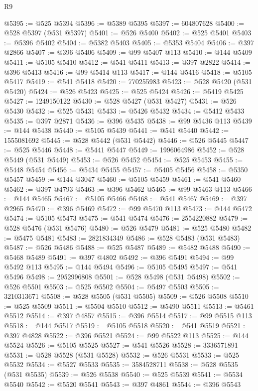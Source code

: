 \begin{lexlean}{R9}
\begin{coremodule}
@5395 := @525 @5394
@5396 := @5389 @5395
@5397 := 604807628
@5400 := @528 @5397 (@531 @5397)
@5401 := @526 @5400
@5402 := @525 @5401
@5403 := @5396 @5402
@5404 := @5382 @5403
@5405 := @5353 @5404
@5406 := @397 @2866
@5407 := @396 @5406
@5409 := @99 @5407 @113
@5410 := @144 @5409
@5411 := @5105 @5410
@5412 := @541 @5411
@5413 := @397 @2822
@5414 := @396 @5413
@5416 := @99 @5414 @113
@5417 := @144 @5416
@5418 := @5105 @5417
@5419 := @541 @5418
@5420 := 770255983
@5423 := @528 @5420 (@531 @5420)
@5424 := @526 @5423
@5425 := @525 @5424
@5426 := @5419 @5425
@5427 := 1249150122
@5430 := @528 @5427 (@531 @5427)
@5431 := @526 @5430
@5432 := @525 @5431
@5433 := @5426 @5432
@5434 := @5412 @5433
@5435 := @397 @2871
@5436 := @396 @5435
@5438 := @99 @5436 @113
@5439 := @144 @5438
@5440 := @5105 @5439
@5441 := @541 @5440
@5442 := 1555081692
@5445 := @528 @5442 (@531 @5442)
@5446 := @526 @5445
@5447 := @525 @5446
@5448 := @5441 @5447
@5449 := 1996064986
@5452 := @528 @5449 (@531 @5449)
@5453 := @526 @5452
@5454 := @525 @5453
@5455 := @5448 @5454
@5456 := @5434 @5455
@5457 := @5405 @5456
@5458 := @5350 @5457
@5459 := @144 @3047
@5460 := @5105 @5459
@5461 := @541 @5460
@5462 := @397 @4793
@5463 := @396 @5462
@5465 := @99 @5463 @113
@5466 := @144 @5465
@5467 := @5105 @5466
@5468 := @541 @5467
@5469 := @397 @2965
@5470 := @396 @5469
@5472 := @99 @5470 @113
@5473 := @144 @5472
@5474 := @5105 @5473
@5475 := @541 @5474
@5476 := 2554220882
@5479 := @528 @5476 (@531 @5476)
@5480 := @526 @5479
@5481 := @525 @5480
@5482 := @5475 @5481
@5483 := 2821834349
@5486 := @528 @5483 (@531 @5483)
@5487 := @526 @5486
@5488 := @525 @5487
@5489 := @5482 @5488
@5490 := @5468 @5489
@5491 := @397 @4802
@5492 := @396 @5491
@5494 := @99 @5492 @113
@5495 := @144 @5494
@5496 := @5105 @5495
@5497 := @541 @5496
@5498 := 2952996808
@5501 := @528 @5498 (@531 @5498)
@5502 := @526 @5501
@5503 := @525 @5502
@5504 := @5497 @5503
@5505 := 3210313671
@5508 := @528 @5505 (@531 @5505)
@5509 := @526 @5508
@5510 := @525 @5509
@5511 := @5504 @5510
@5512 := @5490 @5511
@5513 := @5461 @5512
@5514 := @397 @4857
@5515 := @396 @5514
@5517 := @99 @5515 @113
@5518 := @144 @5517
@5519 := @5105 @5518
@5520 := @541 @5519
@5521 := @397 @4828
@5522 := @396 @5521
@5524 := @99 @5522 @113
@5525 := @144 @5524
@5526 := @5105 @5525
@5527 := @541 @5526
@5528 := 3336571891
@5531 := @528 @5528 (@531 @5528)
@5532 := @526 @5531
@5533 := @525 @5532
@5534 := @5527 @5533
@5535 := 3584528711
@5538 := @528 @5535 (@531 @5535)
@5539 := @526 @5538
@5540 := @525 @5539
@5541 := @5534 @5540
@5542 := @5520 @5541
@5543 := @397 @4861
@5544 := @396 @5543

\end{coremodule}
\end{lexlean}
